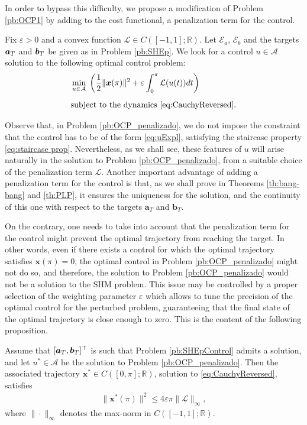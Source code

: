 \documentclass[9pt,shortpaper,twoside,web]{ieeecolor}
\begin{document}
In order to bypass this difficulty, we propose a modification of Problem \ref{pb:OCP1} by adding to the cost functional, a penalization term for the control. 

\begin{problem}\label{pb:OCP_penalizado}
	Fix $\varepsilon>0$ and a convex function $\mathcal{L}\in C([-1,1];\mathbb{R})$.  Let $\mathcal{E}_a$, $\mathcal{E}_b$ and the targets $\bm{a}_T$ and $\bm{b}_T$ be given as in Problem \ref{pb:SHEp}. We look for a control $u\in \mathcal A$ solution to the following optimal control problem:
	\begin{align*}
		&\displaystyle\min_{u \in \mathcal A}\;\left(\dfrac{1}{2} \|\bm{x}(\pi)\|^2 + \varepsilon \displaystyle\int_0^\pi \mathcal{L}(u(t)) dt\right) 
		\\[5pt] 
		&\text{subject to the dynamics \eqref{eq:CauchyReversed}}.
	\end{align*}
\end{problem}

Observe that, in Problem \ref{pb:OCP_penalizado}, we do not impose the constraint that the control has to be of the form \eqref{eq:uExpl}, satisfying the staircase property \eqref{eq:staircase prop}. Nevertheless, as we shall see, these features of $u$ will arise naturally in the solution to Problem \ref{pb:OCP_penalizado}, from a suitable choice of the penalization term $\mathcal{L}$.
Another important advantage of adding a penalization term for the control is that, as we shall prove in Theorems \ref{th:bang-bang} and \ref{th:PLP}, it ensures the uniqueness for the solution, and the continuity of this one with respect to the targets $\bm{a}_T$ and $\bm{b}_T$.

On the contrary, one needs to take into account that the penalization term for the control might prevent the optimal trajectory from reaching the target. In other words, even if there exists a control for which the optimal trajectory satisfies $\bm{x} (\pi) = 0$, the optimal control in Problem \ref{pb:OCP_penalizado} might not do so, and therefore, the solution to Problem \ref{pb:OCP_penalizado} would not be a solution to the SHM problem. This issue may be controlled by a proper selection of the weighting parameter $\varepsilon$ which allows to tune the precision of the optimal control for the perturbed problem, guaranteeing that the final state of the optimal trajectory is close enough to zero. This is the content of the following proposition.

\begin{proposition}\label{Prop:approx controllability}
	Assume that $[\bm{a}_T,\bm{b}_T]^\top$ is such that Problem \ref{pb:SHEpControl} admits a solution, and let $u^\ast\in \mathcal A$ be the solution to Problem \ref{pb:OCP_penalizado}. Then the associated trajectory $\bm{x}^\ast\in C([0,\pi];\mathbb{R})$, solution to \eqref{eq:CauchyReversed}, satisfies
	\begin{align*} 
		\| \bm{x}^\ast (\pi)  \|^2 \leq  4 \varepsilon \pi \| \mathcal{L}\|_\infty,
	\end{align*}
	where $\| \cdot\|_\infty$ denotes the max-norm in $C([-1,1]; \mathbb{R})$.
\end{proposition}
\end{document}
